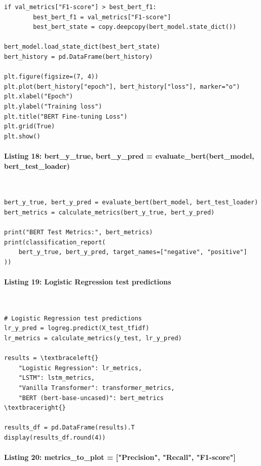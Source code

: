 \documentclass[12pt,a4paper,oneside]{report}
\begin{document}
\begin{Verbatim}[commandchars=\\\{\},breaklines=true,breakanywhere=true,fontsize=\scriptsize,frame=leftline,framesep=2mm,rulecolor=\color{gray}]
    if val_metrics["F1-score"] > best_bert_f1:
        best_bert_f1 = val_metrics["F1-score"]
        best_bert_state = copy.deepcopy(bert_model.state_dict())

bert_model.load_state_dict(best_bert_state)
bert_history = pd.DataFrame(bert_history)

plt.figure(figsize=(7, 4))
plt.plot(bert_history["epoch"], bert_history["loss"], marker="o")
plt.xlabel("Epoch")
plt.ylabel("Training loss")
plt.title("BERT Fine-tuning Loss")
plt.grid(True)
plt.show()
\end{Verbatim}
\paragraph{Listing 18: bert\_y\_true, bert\_y\_pred = evaluate\_bert(bert\_model, bert\_test\_loader)}\mbox{}\\[-1ex]
\begin{Verbatim}[commandchars=\\\{\},breaklines=true,breakanywhere=true,fontsize=\scriptsize,frame=leftline,framesep=2mm,rulecolor=\color{gray}]
bert_y_true, bert_y_pred = evaluate_bert(bert_model, bert_test_loader)
bert_metrics = calculate_metrics(bert_y_true, bert_y_pred)

print("BERT Test Metrics:", bert_metrics)
print(classification_report(
    bert_y_true, bert_y_pred, target_names=["negative", "positive"]
))
\end{Verbatim}
\paragraph{Listing 19: Logistic Regression test predictions}\mbox{}\\[-1ex]
\begin{Verbatim}[commandchars=\\\{\},breaklines=true,breakanywhere=true,fontsize=\scriptsize,frame=leftline,framesep=2mm,rulecolor=\color{gray}]
# Logistic Regression test predictions
lr_y_pred = logreg.predict(X_test_tfidf)
lr_metrics = calculate_metrics(y_test, lr_y_pred)

results = \textbraceleft{}
    "Logistic Regression": lr_metrics,
    "LSTM": lstm_metrics,
    "Vanilla Transformer": transformer_metrics,
    "BERT (bert-base-uncased)": bert_metrics
\textbraceright{}

results_df = pd.DataFrame(results).T
display(results_df.round(4))
\end{Verbatim}
\paragraph{Listing 20: metrics\_to\_plot = ["Precision", "Recall", "F1-score"]}\mbox{}\\[-1ex]
\end{document}
